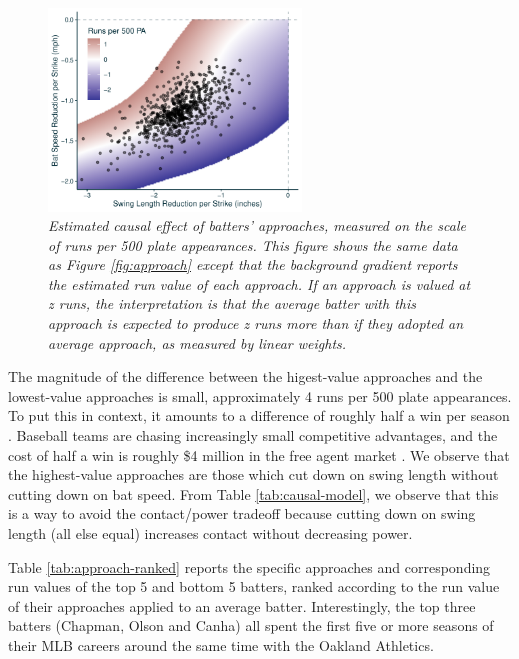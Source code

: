 \documentclass[
  12pt]{article}
\begin{document}
      \begin{figure}[H]
        \centering
        \includegraphics[width = 0.6\textwidth]{../../figures/approach_run_value.pdf}
        \caption{\it Estimated causal effect of batters' approaches, measured on the scale of runs per 500 plate appearances. This figure shows the same data as Figure \ref{fig:approach} except that the background gradient reports the estimated run value of each approach. If an approach is valued at z runs, the interpretation is that the average batter with this approach is expected to produce z runs more than if they adopted an average approach, as measured by linear weights.}
        \label{fig:approach-run-value}
      \end{figure}

      The magnitude of the difference between the higest-value approaches and the lowest-value approaches is small, approximately 4 runs per 500 plate appearances. To put this in context, it amounts to a difference of roughly half a win per season \citep{slowinski_converting_2010}. Baseball teams are chasing increasingly small competitive advantages, and the cost of half a win is roughly \$4 million in the free agent market \citep{clemens_what_2021}. We observe that the highest-value approaches are those which cut down on swing length without cutting down on bat speed. From Table \ref{tab:causal-model}, we observe that this is a way to avoid the contact/power tradeoff because cutting down on swing length (all else equal) increases contact without decreasing power.

      Table \ref{tab:approach-ranked} reports the specific approaches and corresponding run values of the top 5 and bottom 5 batters, ranked according to the run value of their approaches applied to an average batter. Interestingly, the top three batters (Chapman, Olson and Canha) all spent the first five or more seasons of their MLB careers around the same time with the Oakland Athletics.
\end{document}
